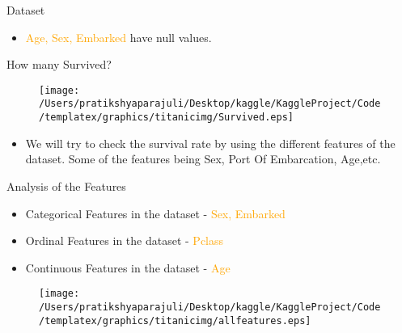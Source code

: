 \documentclass[
 size=14pt,
 paper=smartboard,  %
 mode=present, 		%
 display=slides, 	%
 style=tuliplab,  	%
 pauseslide,
 fleqn,leqno]{powerdot}
\begin{document}
\begin{slide}{Dataset}
  \begin{itemize}
    \item
    \textcolor{orange}{Age, Sex, Embarked} have null values.
    \end{itemize}
  \end{slide}
\begin{slide}{How many Survived?}
 
  \begin{figure}
    \centering
    \centerline{\texttt{[image: /Users/pratikshyaparajuli/Desktop/kaggle/KaggleProject/Code/templatex/graphics/titanicimg/Survived.eps]}}
  \end{figure}
  \begin{itemize}
    \item
    We will try to check the survival rate by using the different features of the dataset. Some of the features being Sex, Port Of Embarcation, Age,etc.
    \end{itemize}
  \end{slide}
\begin{slide}{Analysis of the Features}
\begin{itemize}
\item
Categorical Features in the dataset - \textcolor{orange}{Sex, Embarked}
\item
Ordinal Features in the dataset - \textcolor{orange}{Pclass}
\item
Continuous Features in the dataset - \textcolor{orange}{Age}
\end{itemize}
\begin{figure}
  \centering
  \centerline{\texttt{[image: /Users/pratikshyaparajuli/Desktop/kaggle/KaggleProject/Code/templatex/graphics/titanicimg/allfeatures.eps]}}
\end{figure}
\end{slide}
\end{document}
